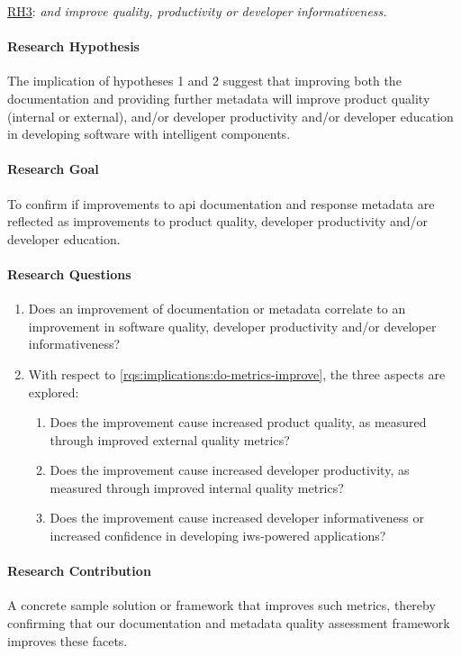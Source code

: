 \begin{titled-frame}{\underline{RH3}: \textit{ and  improve quality,  productivity or developer informativeness.}}
\label{rh3}
\vspace{-12pt}
\paragraph{Research Hypothesis}
The implication of hypotheses 1 and 2 suggest that improving both the documentation and providing further metadata will improve product quality (internal or external), and/or developer productivity and/or developer education in developing software with intelligent components.

\paragraph{Research Goal}
 To confirm if improvements to \gls{api} documentation and response metadata  are reflected as improvements to product quality, developer productivity and/or developer education.

\paragraph{Research Questions}
\begin{enumerate}[label=\textbf{RQ3.\arabic*.}, ref=RQ3.\arabic*, leftmargin=3.5\parindent, rightmargin=1\parindent]
  \item  Does an improvement of documentation or metadata correlate to an improvement in software quality, developer productivity and/or developer informativeness?
  \label{rqs:implications:do-metrics-improve}
  
  \item With respect to \ref{rqs:implications:do-metrics-improve}, the three aspects are explored:
  \begin{enumerate}
  \item Does the improvement cause increased product quality, as measured through improved external quality metrics?
  \item Does the improvement cause increased developer productivity, as measured through improved internal quality metrics?
  \item Does the improvement cause increased developer informativeness or increased confidence in developing \gls{iws}-powered applications?
  \end{enumerate}
  \label{rqs:implications:aspects}  
\end{enumerate}

\paragraph{Research Contribution}
A concrete sample solution or framework that improves such metrics, thereby confirming that our documentation and metadata quality assessment framework improves these facets.
\end{titled-frame}

